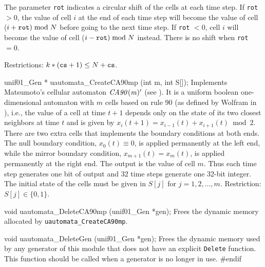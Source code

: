  The parameter {\tt rot} indicates a circular shift of the cells at
 each time step. If {\tt rot} $> 0$, the value of cell $i$ at the end
 of each time step will become the value of cell ($i+ {\tt rot}) \bmod N$
 before going to the next time step. If {\tt rot} $< 0$, cell $i$
 will become the value of cell ($i- {\tt rot}) \bmod N$  instead.
 There is no shift when {\tt rot} $= 0$.

 Restrictions: $k*({\tt cs} + 1) \le N+ {\tt cs}$. 
 \endtab
\code


unif01_Gen * uautomata_CreateCA90mp (int m, int S[]);
\endcode
 \tab Implements Matsumoto's cellular automaton ${\it CA90(m)'}$
  (see \cite{rMAT98b}). %
  It is a uniform boolean one-dimensio\-nal automaton with $m$ cells based on
  rule 90 (as defined by Wolfram in \cite{rWOL83a}), i.e., the value of a
  cell at time $t+1$
  depends only on the state of its two closest neighbors  at time $t$ and
  is given by $x_i(t+1) = x_{i-1}(t) + x_{i+1}(t) \bmod 2$. There are two
  extra cells that implements the boundary conditions at both ends.
  The null boundary condition, $x_0(t) \equiv 0$, is applied permanently
  at the left end, while the mirror boundary condition,
  $x_{m+1}(t) = x_{m}(t) $, is applied permanently at the right end.
  The output is the value of cell $m$. Thus each time step generates
  one bit of output and 32 time steps generate one 32-bit integer.
  The initial state of the cells must be given in $S[j]$ for
  $j = 1, 2, \ldots, m$. Restriction: $S[j] \in \{0, 1 \}$.
 \endtab



\code

void uautomata_DeleteCA90mp (unif01_Gen *gen);
\endcode
  \tab Frees the dynamic memory allocated by
   {\tt uautomata\_CreateCA90mp}.
 \endtab
\code


void uautomata_DeleteGen (unif01_Gen *gen);
\endcode
 \tab  Frees the dynamic memory used by any generator of this module
  that does not have an explicit {\tt Delete} function. 
  This function should be called when a generator
  is no longer in use.
 \endtab
\code\hide
#endif
\endhide\endcode
